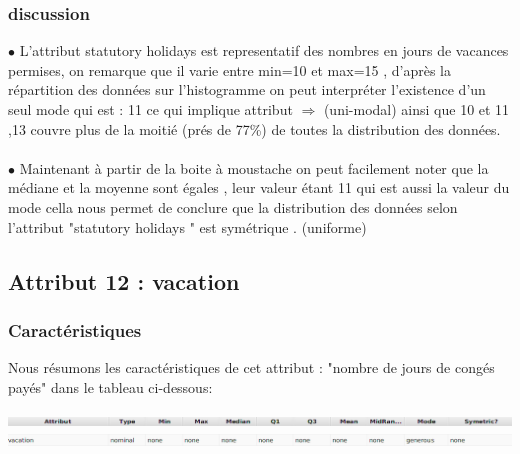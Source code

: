 \documentclass[12pt,a4paper,oneside]{book}
\begin{document}
\subsubsection*{discussion}


$\bullet$ L'attribut statutory holidays est representatif des nombres en jours de vacances permises, on remarque que il varie entre min=10 et max=15 , d'après la répartition des données sur l'histogramme on peut interpréter l'existence d'un seul mode qui est : 11 ce qui implique attribut $\Rightarrow$ (uni-modal) ainsi que 10 et 11 ,13 couvre plus de la moitié (prés de 77\%) de toutes la distribution des données.\\
\textbf{ }\\
$\bullet$ Maintenant à partir de la boite à moustache on peut facilement noter que la médiane et la moyenne sont égales , leur valeur étant 11 qui est aussi la valeur du mode cella nous permet de conclure que la distribution des données selon l'attribut "statutory holidays " est symétrique . (uniforme) 

\newpage

\subsection{Attribut 12 : vacation}
\subsubsection{Caractéristiques}
Nous résumons les caractéristiques de cet attribut : "nombre de jours de congés payés" dans le tableau ci-dessous:
\begin{center}
	\includegraphics[width=1\textwidth]{screens/att.png}\\ \includegraphics[width=1\textwidth]{screens/att-13.png}%
	\label{labelname}%
\end{center}
\end{document}

